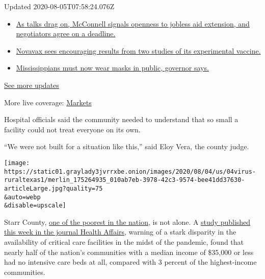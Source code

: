 Updated 2020-08-05T07:58:24.076Z

\begin{itemize}
\tightlist
\item
  \href{https://www.nytimes3xbfgragh.onion/2020/08/04/world/coronavirus-cases.html?action=click\&pgtype=Article\&state=default\&region=MAIN_CONTENT_1\&context=storylines_live_updates\#link-762df92}{As
  talks drag on, McConnell signals openness to jobless aid extension,
  and negotiators agree on a deadline.}
\item
  \href{https://www.nytimes3xbfgragh.onion/2020/08/04/world/coronavirus-cases.html?action=click\&pgtype=Article\&state=default\&region=MAIN_CONTENT_1\&context=storylines_live_updates\#link-1228a480}{Novavax
  sees encouraging results from two studies of its experimental
  vaccine.}
\item
  \href{https://www.nytimes3xbfgragh.onion/2020/08/04/world/coronavirus-cases.html?action=click\&pgtype=Article\&state=default\&region=MAIN_CONTENT_1\&context=storylines_live_updates\#link-794484ed}{Mississippians
  must now wear masks in public, governor says.}
\end{itemize}

\href{https://www.nytimes3xbfgragh.onion/2020/08/04/world/coronavirus-cases.html?action=click\&pgtype=Article\&state=default\&region=MAIN_CONTENT_1\&context=storylines_live_updates}{See
more updates}

More live coverage:
\href{https://www.nytimes3xbfgragh.onion/live/2020/08/04/business/stock-market-today-coronavirus?action=click\&pgtype=Article\&state=default\&region=MAIN_CONTENT_1\&context=storylines_live_updates}{Markets}

Hospital officials said the community needed to understand that so small
a facility could not treat everyone on its own.

``We were not built for a situation like this,'' said Eloy Vera, the
county judge.

\texttt{[image: https://static01.graylady3jvrrxbe.onion/images/2020/08/04/us/04virus-ruraltexas1/merlin\_175264935\_010ab7eb-3978-42c3-9574-bee41dd37630-articleLarge.jpg?quality=75\\\&auto=webp\\\&disable=upscale]}

Starr County,
\href{https://www.usatoday.com/story/money/2019/01/25/poorest-counties-in-the-us-median-household-income/38870175/}{one
of the poorest in the nation}, is not alone. A
\href{https://www.healthaffairs.org/doi/10.1377/hlthaff.2020.00581}{study
published this week in the journal Health Affairs}, warning of a stark
disparity in the availability of critical care facilities in the midst
of the pandemic, found that nearly half of the nation's communities with
a median income of \$35,000 or less had no intensive care beds at all,
compared with 3 percent of the highest-income communities.

